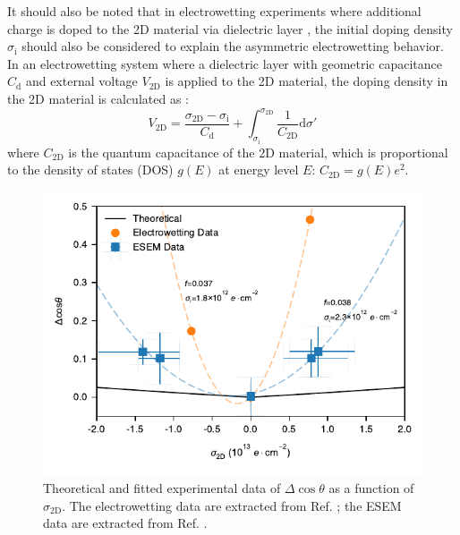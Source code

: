 \documentclass[aps,prl,reprint,groupedaddress,amsmath,amssymb, showpacs]{revtex4-1}
\begin{document}
It should also be noted that in electrowetting experiments
where additional charge is doped to the 2D material via dielectric
layer \cite{hong_mechanism_2016}, the initial doping density
\(\sigma_{\mathrm{i}}\) should also be considered to explain the
asymmetric electrowetting behavior. In an electrowetting system where a
dielectric layer with geometric capacitance \(C_{\mathrm{d}}\) and external
voltage \(V_{\mathrm{2D}}\) is applied to the 2D material, the doping
density in the 2D material is calculated as \cite{tian_multiscale_2016}:
\begin{equation}
\label{eqn:doping-vm-2D}
V_{\mathrm{2D}} = \frac{\sigma_{\mathrm{2D}} - \sigma_{\mathrm{i}}} {C_{\mathrm{d}}} 
                 + \int_{\sigma_{\mathrm{i}}}^{\sigma_{\mathrm{2D}}} 
                   \frac{1}{C_{\mathrm{2D}}} \mathrm{d}\sigma'
\end{equation}
where \(C_{\mathrm{2D}}\) is the quantum capacitance of the 2D material, which is proportional to the density of states (DOS) \(g(E)\) at energy level \(E\): \(C_{\mathrm{2D}}=g(E)e^{2}\).

\begin{figure}[htbp]
\centering
\includegraphics[width=0.95\linewidth]{../img/plot-fitting.pdf}
\caption{\label{fig:f-nc-exp}
Theoretical and fitted experimental data of \(\Delta\cos\theta\) as a function of \(\sigma_{\mathrm{2D}}\). The electrowetting data are extracted from Ref. \cite{hong_mechanism_2016}; the ESEM data are extracted from Ref. \cite{ashraf_doping-induced_2016}.}
\end{figure}
\end{document}
